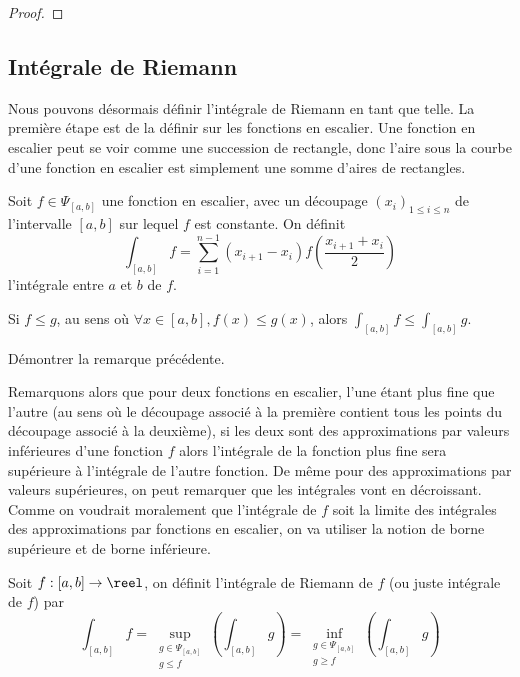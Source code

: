\begin{proof}
\end{proof}

\subsection{Intégrale de Riemann}

Nous pouvons désormais définir l'intégrale de Riemann en tant que telle. La première étape est de la définir sur les fonctions en escalier. Une fonction en escalier peut se voir comme une succession de rectangle, donc l'aire sous la courbe d'une fonction en escalier est simplement une somme d'aires de rectangles.

\begin{defi}
    Soit $f\in \Psi_{[a,b]}$ une fonction en escalier, avec un découpage $(x_i)_{1\leq i \leq n}$ de l'intervalle $[a,b]$ sur lequel $f$ est constante. On définit $$\int_{[a,b]}f = \sum_{i = 1}^{n-1}(x_{i+1}-x_i) f\left(\frac{x_{i+1}+x_i}{2}\right)$$ l'intégrale entre $a$ et $b$ de $f$.
\end{defi}

\begin{rmk}
    Si $f \leq g$, au sens où $\forall x\in[a,b],f(x)\leq g(x)$, alors $\int_{[a,b]} f \leq \int_{[a,b]} g$.
\end{rmk}

\begin{exo}
    Démontrer la remarque précédente.
\end{exo}

Remarquons alors que pour deux fonctions en escalier, l'une étant plus fine que l'autre (au sens où le découpage associé à la première contient tous les points du découpage associé à la deuxième), si les deux sont des approximations par valeurs inférieures d'une fonction $f$ alors l'intégrale de la fonction plus fine sera supérieure à l'intégrale de l'autre fonction. De même pour des approximations par valeurs supérieures, on peut remarquer que les intégrales vont en décroissant. Comme on voudrait moralement que l'intégrale de $f$ soit la limite des intégrales des approximations par fonctions en escalier, on va utiliser la notion de borne supérieure et de borne inférieure.

\begin{defi}
    Soit $f : [a,b]\to\reel$, on définit l'intégrale de Riemann de $f$ (ou juste \og intégrale de $f$\fg{}) par $$\int_{[a,b]} f = \sup_{\substack{g\in\Psi_{[a,b]}\\g \leq f}}\left(\int_{[a,b]} g\right) = \inf_{\substack{g\in\Psi_{[a,b]}\\g \geq f}}\left(\int_{[a,b]} g\right)$$
\end{defi}

